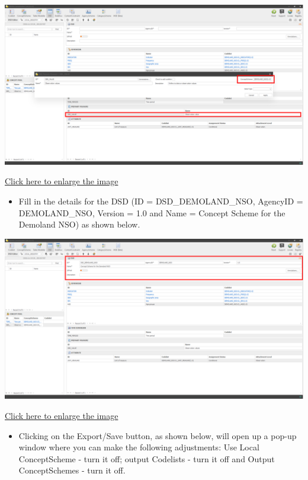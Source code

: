\documentclass[
]{book}
\providecommand{\tightlist}{%
  \setlength{\itemsep}{0pt}\setlength{\parskip}{0pt}}
\begin{document}
\begin{center}\includegraphics[width=1\linewidth]{./images/image253} \end{center}

\href{images/image253.png}{Click here to enlarge the image}

\begin{itemize}
\tightlist
\item
  Fill in the details for the DSD (ID = DSD\_DEMOLAND\_NSO, AgencyID = DEMOLAND\_NSO, Version = 1.0 and Name = Concept Scheme for the Demoland NSO) as shown below.
\end{itemize}

\begin{center}\includegraphics[width=1\linewidth]{./images/image254} \end{center}

\href{images/image254.png}{Click here to enlarge the image}

\begin{itemize}
\tightlist
\item
  Clicking on the Export/Save button, as shown below, will open up a pop-up window where you can make the following adjustments: Use Local ConceptScheme - turn it off; output Codelists - turn it off and Output ConceptSchemes - turn it off.
\end{itemize}
\end{document}
